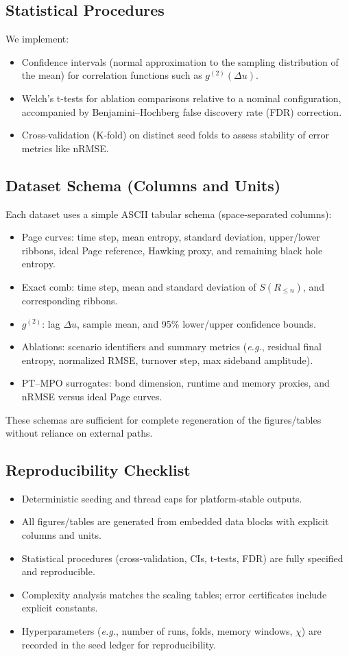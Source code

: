 \documentclass[aps,prd,preprint,onecolumn,superscriptaddress,nofootinbib,longbibliography,floatfix,11pt,showpacs,showkeys]{revtex4-2}
\newcommand{\eg}{\textit{e.g.}\xspace}
\theoremstyle{plain}
\theoremstyle{definition}
\theoremstyle{remark}
\begin{document}
\subsection{Statistical Procedures}
We implement:
\begin{itemize}
  \item Confidence intervals (normal approximation to the sampling distribution of the mean) for correlation functions such as $g^{(2)}(\Delta u)$.
  \item Welch's t-tests for ablation comparisons relative to a nominal configuration, accompanied by Benjamini--Hochberg false discovery rate (FDR) correction.
  \item Cross-validation (K-fold) on distinct seed folds to assess stability of error metrics like nRMSE.
\end{itemize}

\subsection{Dataset Schema (Columns and Units)}
Each dataset uses a simple ASCII tabular schema (space-separated columns):
\begin{itemize}
  \item Page curves: time step, mean entropy, standard deviation, upper/lower ribbons, ideal Page reference, Hawking proxy, and remaining black hole entropy.
  \item Exact comb: time step, mean and standard deviation of $S(R_{\le n})$, and corresponding ribbons.
  \item $g^{(2)}$: lag $\Delta u$, sample mean, and 95\% lower/upper confidence bounds.
  \item Ablations: scenario identifiers and summary metrics (\eg, residual final entropy, normalized RMSE, turnover step, max sideband amplitude).
  \item PT--MPO surrogates: bond dimension, runtime and memory proxies, and nRMSE versus ideal Page curves.
\end{itemize}
These schemas are sufficient for complete regeneration of the figures/tables without reliance on external paths.

\subsection{Reproducibility Checklist}
\begin{itemize}
  \item Deterministic seeding and thread caps for platform-stable outputs.
  \item All figures/tables are generated from embedded data blocks with explicit columns and units.
  \item Statistical procedures (cross-validation, CIs, t-tests, FDR) are fully specified and reproducible.
  \item Complexity analysis matches the scaling tables; error certificates include explicit constants.
  \item Hyperparameters (\eg, number of runs, folds, memory windows, $\chi$) are recorded in the seed ledger for reproducibility.
\end{itemize}
\end{document}
